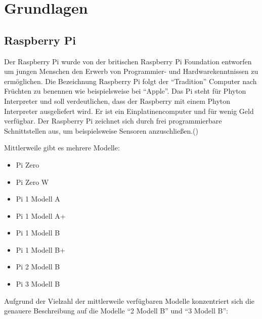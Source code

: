 
\chapter{Grundlagen}
\section{Raspberry Pi}\label{Raspberry}

Der Raspberry Pi wurde von der britischen Raspberry Pi Foundation entworfen um jungen Menschen den Erwerb von Programmier- und Hardwarekenntnissen zu
ermöglichen. Die Bezeichnung Raspberry Pi folgt der "`Tradition"' Computer nach Früchten zu benennen wie beispielsweise bei "`Apple"'. Das Pi steht für Phyton Interpreter und soll verdeutlichen, dass der Raspberry mit einem Phyton Interpreter ausgeliefert wird. Er ist ein Einplatinencomputer und für wenig Geld verfügbar. Der Raspberry Pi zeichnet sich durch frei programmierbare Schnittstellen aus, um beispielsweise Sensoren anzuschließen.(\cite{SWB-435432907})

Mittlerweile gibt es mehrere Modelle:

\begin{itemize} 
\item Pi Zero 
\item Pi Zero W
\item Pi 1 Modell A
\item Pi 1 Modell A+
\item Pi 1 Modell B
\item Pi 1 Modell B+
\item Pi 2 Modell B
\item Pi 3 Modell B 
\end{itemize}

Aufgrund der Vielzahl der mittlerweile verfügbaren Modelle konzentriert sich die genauere Beschreibung auf die Modelle "`2 Modell B"' und "`3 Modell B"':

